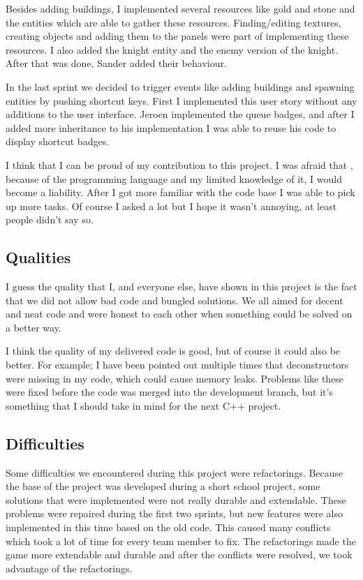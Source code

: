 Besides adding buildings, I implemented several resources like gold and stone and the entities which are able to gather these resources. Finding/editing textures, creating objects and adding them to the panels were part of implementing these resources. I also added the knight entity and the enemy version of the knight. After that was done, Sander added their behaviour.

In the last sprint we decided to trigger events like adding buildings and spawning entities by pushing shortcut keys. First I implemented this user story without any additions to the user interface. Jeroen implemented the queue badges, and after I added more inheritance to his implementation I was able to reuse his code to display shortcut badges.

I think that I can be proud of my contribution to this project. I was afraid that , because of the programming language and my limited knowledge of it, I would become a liability. After I got more familiar with the code base I was able to pick up more tasks. Of course I asked a lot but I hope it wasn't annoying, at least people didn't say so.

\subsection{Qualities}
I guess the quality that I, and everyone else, have shown in this project is the fact that we did not allow bad code and bungled solutions. We all aimed for decent and neat code and were honest to each other when something could be solved on a better way.

I think the quality of my delivered code is good, but of course it could also be better. For example; I have been pointed out multiple times that deconstructors were missing in my code, which could cause memory leaks. Problems like these were fixed before the code was merged into the development branch, but it's something that I should take in mind for the next C++ project.

\subsection{Difficulties}
Some difficulties we encountered during this project were refactorings. Because the base of the project was developed during a short school project, some solutions that were implemented were not really durable and extendable. These problems were repaired during the first two sprints, but new features were also implemented in this time based on the old code. This caused many conflicts which took a lot of time for every team member to fix. The refactorings made the game more extendable and durable and after the conflicts were resolved, we took advantage of the refactorings.



